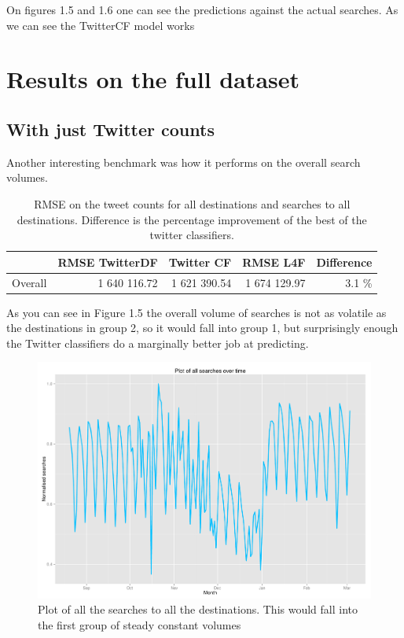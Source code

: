 \documentclass[minf,frontabs,twoside,singlespacing,parskip]{infthesis}
\begin{document}
On figures 1.5 and 1.6 one can see the predictions against the actual searches. As we can see the TwitterCF model works 

\newpage
\section{Results on the full dataset}

\subsection{With just Twitter counts}

Another interesting benchmark was how it performs on the overall search volumes. 

\begin{table}[h]
\begin{center}
\begin{tabular}{ l | r | r | r | r}
 & RMSE TwitterDF & Twitter CF & RMSE L4F & Difference \\
\hline
Overall & 1 640 116.72 & 1 621 390.54  & 1 674 129.97 & 3.1 \% \\
\end{tabular}
\end{center}
\caption{RMSE on the tweet counts for all destinations and searches to all destinations. Difference is the percentage improvement of the best of the twitter classifiers.}
\end{table}

As you can see in Figure 1.5 the overall volume of searches is not as volatile as the destinations in group 2, so it would fall into group 1, but surprisingly enough the Twitter classifiers do a marginally better job at predicting.

\begin{figure}[h!]
\begin{center}
\includegraphics[scale=0.4]{overall}
\end{center}
\caption{Plot of all the searches to all the destinations. This would fall into the first group of steady constant volumes}
\end{figure}
\end{document}
